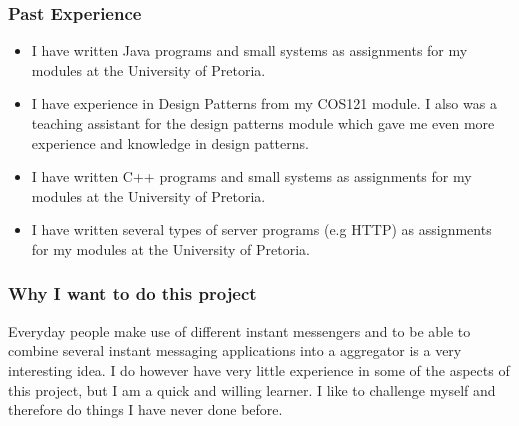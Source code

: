 \subsubsection{Past Experience} 
\begin{itemize}
	\item{I have written Java programs and small systems as assignments for my modules at the University of Pretoria}.
	\item{I have experience in Design Patterns from my COS121 module. I also was a teaching assistant for the design patterns module which gave me even more experience and knowledge in design patterns}.
	\item{I have written C++ programs and small systems as assignments for my modules at the University of Pretoria}.
	\item{I have written several types of server programs (e.g HTTP) as assignments for my modules at the University of Pretoria}.
\end{itemize}
\subsubsection{Why I want to do this project}
Everyday people make use of different instant messengers and to be able to combine several instant messaging applications into a aggregator is a very interesting idea. I do however have very little experience in some of the aspects of this project, but I am a quick and willing learner. I like to challenge myself and therefore do things I have never done before.

